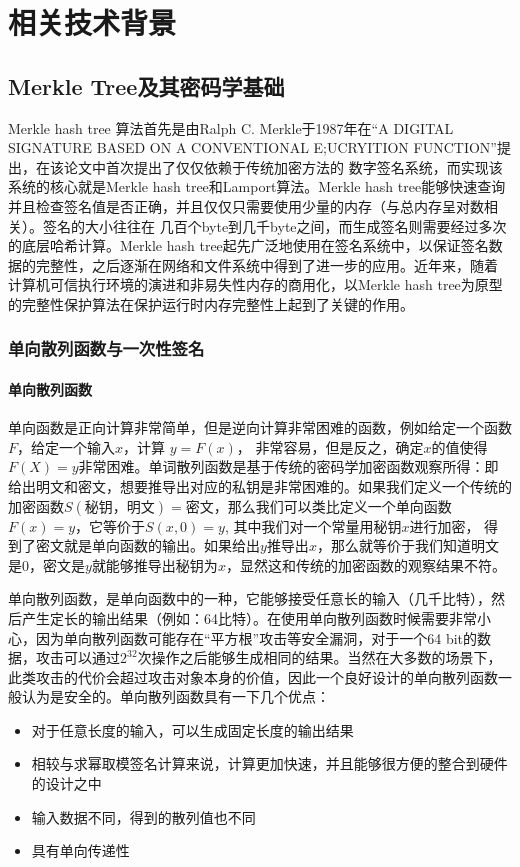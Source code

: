 
\chapter{相关技术背景}

\section{Merkle Tree及其密码学基础}
Merkle hash tree \cite{merkle1987digital}算法首先是由Ralph C. Merkle于1987年在“A DIGITAL SIGNATURE BASED ON A CONVENTIONAL E;UCRYITION FUNCTION”提出，在该论文中首次提出了仅仅依赖于传统加密方法的
数字签名系统，而实现该系统的核心就是Merkle hash tree和Lamport算法。Merkle hash tree能够快速查询并且检查签名值是否正确，并且仅仅只需要使用少量的内存（与总内存呈对数相关）。签名的大小往往在
几百个byte到几千byte之间，而生成签名则需要经过多次的底层哈希计算。Merkle hash tree起先广泛地使用在签名系统中，以保证签名数据的完整性，之后逐渐在网络和文件系统中得到了进一步的应用。近年来，随着
计算机可信执行环境的演进和非易失性内存的商用化，以Merkle hash tree为原型的完整性保护算法在保护运行时内存完整性上起到了关键的作用。

\subsection{单向散列函数与一次性签名}
\subsubsection{单向散列函数}
单向函数是正向计算非常简单，但是逆向计算非常困难的函数，例如给定一个函数$F$，给定一个输入$x$，计算 $y=F(x)$， 非常容易，但是反之，确定$x$的值使得$F(X)=y$非常困难。单词散列函数是基于传统的密码学加密函数观察所得：即
给出明文和密文，想要推导出对应的私钥是非常困难的。如果我们定义一个传统的加密函数$S(秘钥，明文) = 密文$，那么我们可以类比定义一个单向函数$F(x) = y$，它等价于$S(x,0) = y$, 其中我们对一个常量用秘钥$x$进行加密，
得到了密文就是单向函数的输出。如果给出$y$推导出$x$，那么就等价于我们知道明文是0，密文是$y$就能够推导出秘钥为$x$，显然这和传统的加密函数的观察结果不符。

单向散列函数，是单向函数中的一种，它能够接受任意长的输入（几千比特），然后产生定长的输出结果（例如：64比特）。在使用单向散列函数时候需要非常小心，因为单向散列函数可能存在“平方根”攻击等安全漏洞，对于一个64
bit的数据，攻击可以通过$2^{32}$次操作之后能够生成相同的结果。当然在大多数的场景下，此类攻击的代价会超过攻击对象本身的价值，因此一个良好设计的单向散列函数一般认为是安全的。单向散列函数具有一下几个优点：
\begin{itemize}
    \item 对于任意长度的输入，可以生成固定长度的输出结果
    \item 相较与求幂取模签名计算来说，计算更加快速，并且能够很方便的整合到硬件的设计之中
    \item 输入数据不同，得到的散列值也不同
    \item 具有单向传递性
\end{itemize}

